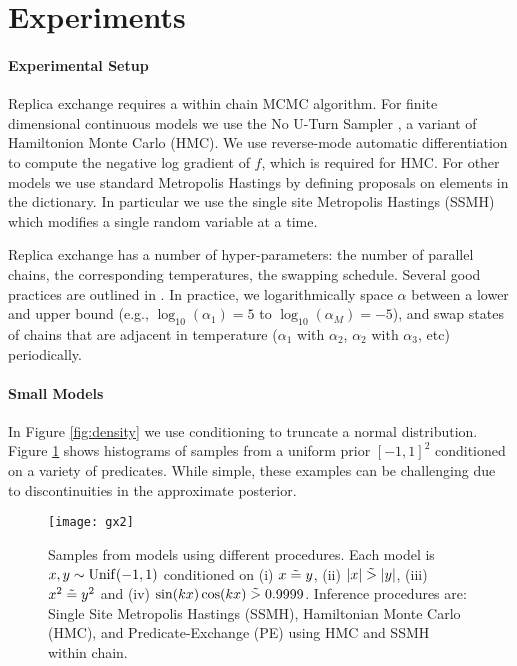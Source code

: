 
\section{Experiments}\label{experiments}

\paragraph{Experimental Setup}Replica exchange requires a within chain MCMC algorithm.
For finite dimensional continuous models we use the No U-Turn Sampler \cite{hoffman2014no}, a variant of Hamiltonion Monte Carlo (HMC).
We use reverse-mode automatic differentiation \cite{griewank2008evaluating} to compute the negative log gradient of $f$, which is required for HMC.
For other models we use standard Metropolis Hastings by defining proposals on elements in the dictionary.
In particular we use the single site Metropolis Hastings (SSMH) \cite{wingate2011lightweight} which modifies a single random variable at a time.

Replica exchange has a number of hyper-parameters: the number of parallel chains, the corresponding temperatures, the swapping schedule.
Several good practices are outlined in \cite{earl2005parallel}.  In practice, we logarithmically space $\alpha$ between a lower and upper bound (e.g., $\log_{10}(\alpha_1) = 5$ to $\log_{10}(\alpha_M) = -5$), and swap states of chains that are adjacent in temperature ($\alpha_1$ with $\alpha_2$, $\alpha_2$ with $\alpha_3$, etc) periodically.


\paragraph{Small Models}
In Figure \ref{fig:density} we use conditioning to truncate a normal distribution. Figure  \ref{gridn} shows histograms of samples from a uniform prior  $[-1, 1]^2$ conditioned on a variety of predicates.  While simple, these examples can be challenging due to discontinuities in the approximate posterior.



\begin{figure}[!htb]
	\centering
	\texttt{[image: gx2]}
	\caption{Samples from models using different procedures.  Each model is $x,y \sim \operatorname{Unif}(-1,1)$ conditioned on (i) $x \mathrel{\tilde{=}} y$, (ii) $|x| \mathrel{\tilde{>}} |y|$, (iii) $x^2 \mathrel{\tilde{=}} y^2$ and (iv) $\sin(kx)\cos(kx) \mathrel{\tilde{>}} 0.9999$.
	Inference procedures are: Single Site Metropolis Hastings (SSMH), Hamiltonian Monte Carlo (HMC), and Predicate-Exchange (PE) using HMC and SSMH within chain.}
	\label{gridn}
\end{figure}	

